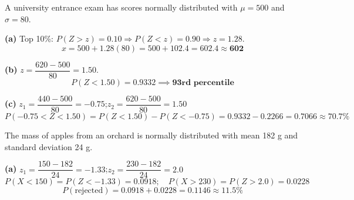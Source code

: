 \documentclass[addpoints]{exam}
\begin{document}
\begin{questions}
\question A university entrance exam has scores normally distributed with $\mu = 500$ and
$\sigma = 80$.
\begin{solution}[9cm]
\textbf{(a)} Top 10\%: $P(Z > z) = 0.10 \Rightarrow P(Z < z) = 0.90 \Rightarrow z = 1.28$.
\[
x = 500 + 1.28(80) = 500 + 102.4 = \mathbf{602.4 \approx 602}
\]

\textbf{(b)} $z = \dfrac{620-500}{80} = 1.50$.
\[
P(Z < 1.50) = 0.9332 \implies \textbf{93rd percentile}
\]

\textbf{(c)} $z_1 = \dfrac{440-500}{80} = -0.75$;\quad $z_2 = \dfrac{620-500}{80} = 1.50$
\[
P(-0.75 < Z < 1.50) = P(Z<1.50) - P(Z<-0.75) = 0.9332 - 0.2266 = \mathbf{0.7066 \approx 70.7\%}
\]
\end{solution}

\question The mass of apples from an orchard is normally distributed with mean 182 g and
standard deviation 24 g.
\begin{solution}[9cm]
\textbf{(a)} $z_1 = \dfrac{150-182}{24} = -1.33$;\quad $z_2 = \dfrac{230-182}{24} = 2.0$
\[
P(X<150) = P(Z<-1.33) = 0.0918;\quad P(X>230) = P(Z>2.0) = 0.0228
\]
\[
P(\text{rejected}) = 0.0918 + 0.0228 = \mathbf{0.1146 \approx 11.5\%}
\]


\end{solution}
\end{questions}
\end{document}
